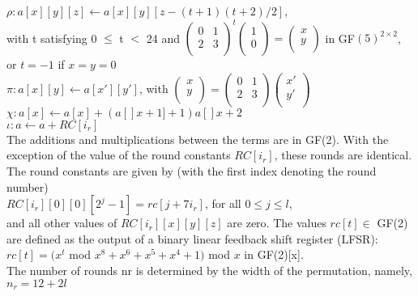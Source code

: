 $\rho : a[x][y][z] \leftarrow a[x][y][z − (t + 1)(t + 2)/2]$,\\
with t satisfying 0 $\leq$ t $<$ 24 and
$ \left( \begin{array}{cc}
0 & 1 \\
2 & 3 \\
\end{array}
\right)^{t}
\left(
\begin{array}{c}
1 \\
0 \\
\end{array}
\right) =
\left(
\begin{array}{c}
x\\
y\\
\end{array}
\right)
$ in GF$(5)^{2 \times 2}$,\\
or $t = -1$ if $x = y = 0$ \\

$ \pi: a[x][y] \leftarrow a[x'][y'] $, with
$\left( \begin{array}{c}
x \\
y \\
\end{array}
\right) = \left( \begin{array}{cc}
0 & 1 \\
2 & 3 \\
\end{array}
\right)
\left( \begin{array}{c}
x' \\
y' \\
\end{array}
\right)$\\

$\chi: a[x] \leftarrow a[x] + (a[]x+1]+1)a[]x+2$\\

$\iota: a \leftarrow a + RC[i_r]$ \\


The additions and multiplications between the terms are in GF(2). With the exception of
the value of the round constants $RC[i_r]$, these rounds are identical. The round constants are
given by (with the first index denoting the round number)\\

$RC[i_r][0][0][2^j − 1] = rc[j + 7i_r ]$, for all $0 \leq j \leq l$,\\

and all other values of $RC[i_r][x][y][z]$ are zero. The values $rc[t] \in $ GF(2) are defined as the
output of a binary linear feedback shift register (LFSR):\\

$rc[t] = (x^t$ mod $x^8 + x^6 + x^5 + x^4 + 1)$ mod $x$ in GF(2)[x].\\

The number of rounds nr is determined by the width of the permutation, namely,\\

\centering
$n_r = 12 + 2l$
